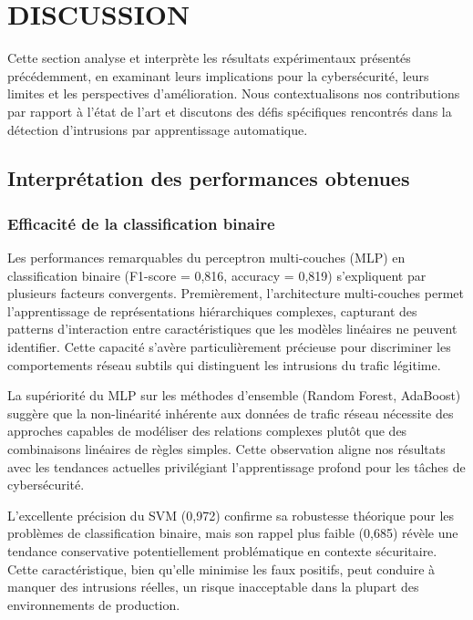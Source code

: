 \newpage
\chapter{DISCUSSION}

Cette section analyse et interprète les résultats expérimentaux présentés précédemment, en examinant leurs implications pour la cybersécurité, leurs limites et les perspectives d'amélioration. Nous contextualisons nos contributions par rapport à l'état de l'art et discutons des défis spécifiques rencontrés dans la détection d'intrusions par apprentissage automatique.

\section{Interprétation des performances obtenues}

\subsection{Efficacité de la classification binaire}

Les performances remarquables du perceptron multi-couches (MLP) en classification binaire (F1-score = 0,816, accuracy = 0,819) s'expliquent par plusieurs facteurs convergents. Premièrement, l'architecture multi-couches permet l'apprentissage de représentations hiérarchiques complexes, capturant des patterns d'interaction entre caractéristiques que les modèles linéaires ne peuvent identifier. Cette capacité s'avère particulièrement précieuse pour discriminer les comportements réseau subtils qui distinguent les intrusions du trafic légitime.

La supériorité du MLP sur les méthodes d'ensemble (Random Forest, AdaBoost) suggère que la non-linéarité inhérente aux données de trafic réseau nécessite des approches capables de modéliser des relations complexes plutôt que des combinaisons linéaires de règles simples. Cette observation aligne nos résultats avec les tendances actuelles privilégiant l'apprentissage profond pour les tâches de cybersécurité.

L'excellente précision du SVM (0,972) confirme sa robustesse théorique pour les problèmes de classification binaire, mais son rappel plus faible (0,685) révèle une tendance conservative potentiellement problématique en contexte sécuritaire. Cette caractéristique, bien qu'elle minimise les faux positifs, peut conduire à manquer des intrusions réelles, un risque inacceptable dans la plupart des environnements de production.


